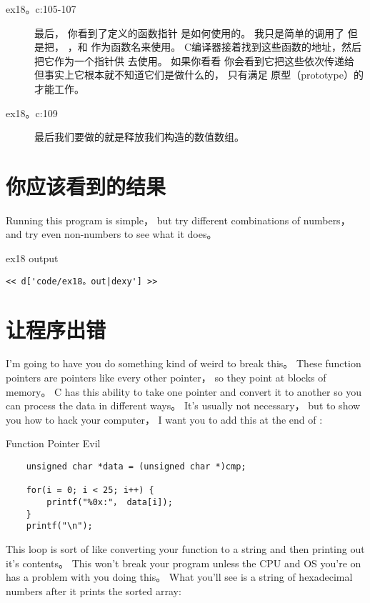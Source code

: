 \begin{description}
\item[ex18。c:105-107] 最后， 你看到了定义的函数指针 是如何使用的。 我只是简单的调用了  但是把， ，和
    作为函数名来使用。 C编译器接着找到这些函数的地址，然后把它作为一个指针供  去使用。 如果你看看 你会看到它把这些依次传递给 但事实上它根本就不知道它们是做什么的， 只有满足 原型（prototype）的才能工作。
\item[ex18。c:109] 最后我们要做的就是释放我们构造的数值数组。
\end{description}


\section{你应该看到的结果}

Running this program is simple， but try different combinations of numbers， and
try even non-numbers to see what it does。

\begin{code}{ex18 output}
\begin{lstlisting}
<< d['code/ex18。out|dexy'] >>
\end{lstlisting}
\end{code}


\section{让程序出错}

I'm going to have you do something kind of weird to break this。  These function
pointers are pointers like every other pointer， so they point at blocks of
memory。  C has this ability to take one pointer and convert it to another so
you can process the data in different ways。  It's usually not necessary， but
to show you how to hack your computer， I want you to add this at the end of
:

\begin{code}{Function Pointer Evil}
\begin{lstlisting}
    unsigned char *data = (unsigned char *)cmp;

    for(i = 0; i < 25; i++) {
        printf("%0x:"， data[i]);
    }
    printf("\n");
\end{lstlisting}
\end{code}

This loop is sort of like converting your function to a string and then
printing out it's contents。  This won't break your program unless the CPU and
OS you're on has a problem with you doing this。  What you'll see is a string of
hexadecimal numbers after it prints the sorted array:

